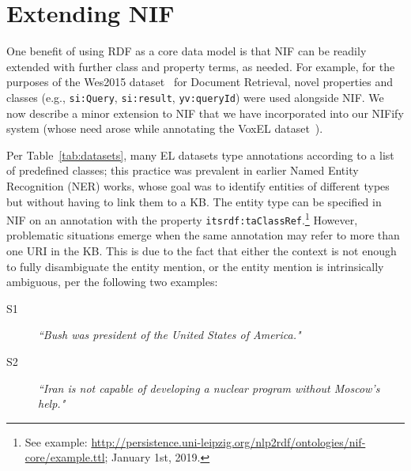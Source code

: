 \documentclass[sigconf]{acmart}
\begin{document}
 

\section{Extending NIF}
\label{sec:nifmod}

One benefit of using RDF as a core data model is that NIF can be readily extended with further class and property terms, as needed. For example, for the purposes of the Wes2015 dataset~\cite{wes2015} for Document Retrieval, novel properties and classes (e.g., \texttt{si:Query}, \texttt{si:result}, \texttt{yv:queryId}) were used alongside  NIF. We now describe a minor extension to NIF that we have incorporated into our NIFify system (whose need arose while annotating the VoxEL dataset~\cite{VoxEL2018}).

%

Per Table~\ref{tab:datasets}, many EL datasets type annotations according to a list of predefined classes; this practice was prevalent in earlier Named Entity Recognition (NER) works, whose goal was to identify entities of different types but without having to link them to a KB. The entity type can be specified in NIF on an annotation with the property \texttt{itsrdf:taClassRef}.\footnote{See example: \url{http://persistence.uni-leipzig.org/nlp2rdf/ontologies/nif-core/example.ttl}; January 1st, 2019.} However, problematic situations emerge when the same annotation may refer to more than one URI in the KB. This is due to the fact that either the context is not enough to fully disambiguate the entity mention, or the entity mention is intrinsically ambiguous, per the following two examples:

\begin{description}
\item[S1] \textit{``Bush was president of the United States of America."}
\item[S2] \textit{``Iran is not capable of developing a nuclear program without Moscow's help."}
\end{description}
\end{document}
